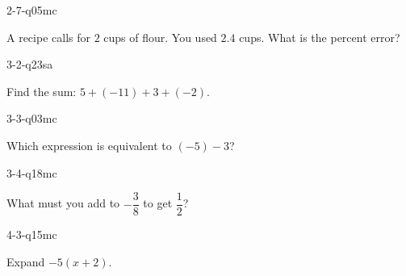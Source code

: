\begin{practiceQuestion}{2-7-q05}{mc}
\begin{questionText}
A recipe calls for $2$ cups of flour. You used $2.4$ cups. What is the percent error?
\end{questionText}
\end{practiceQuestion}

\begin{practiceQuestion}{3-2-q23}{sa}
\begin{questionText}
Find the sum: $5 + (-11) + 3 + (-2)$.
\end{questionText}
\end{practiceQuestion}

\begin{practiceQuestion}{3-3-q03}{mc}
\begin{questionText}
Which expression is equivalent to $(-5) - 3$?
\end{questionText}
\end{practiceQuestion}

\begin{practiceQuestion}{3-4-q18}{mc}
\begin{questionText}
What must you add to $-\dfrac{3}{8}$ to get $\dfrac{1}{2}$?
\end{questionText}
\end{practiceQuestion}

\begin{practiceQuestion}{4-3-q15}{mc}
\begin{questionText}
Expand $-5(x + 2)$.
\end{questionText}
\end{practiceQuestion}

